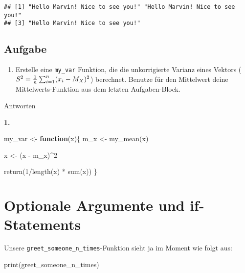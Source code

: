 \documentclass[
]{book}
\newenvironment{Shaded}{\begin{snugshade}}{\end{snugshade}}
\newcommand{\ControlFlowTok}[1]{\textcolor[rgb]{0.13,0.29,0.53}{\textbf{#1}}}
\newcommand{\DecValTok}[1]{\textcolor[rgb]{0.00,0.00,0.81}{#1}}
\newcommand{\FunctionTok}[1]{\textcolor[rgb]{0.00,0.00,0.00}{#1}}
\newcommand{\NormalTok}[1]{#1}
\newcommand{\OtherTok}[1]{\textcolor[rgb]{0.56,0.35,0.01}{#1}}
\newcommand{\SpecialCharTok}[1]{\textcolor[rgb]{0.00,0.00,0.00}{#1}}
\providecommand{\tightlist}{%
  \setlength{\itemsep}{0pt}\setlength{\parskip}{0pt}}
\begin{document}
\begin{verbatim}
## [1] "Hello Marvin! Nice to see you!" "Hello Marvin! Nice to see you!"
## [3] "Hello Marvin! Nice to see you!"
\end{verbatim}

\hypertarget{aufgabe-1}{%
\subsection{Aufgabe}\label{aufgabe-1}}

\begin{enumerate}
\def\labelenumi{\arabic{enumi}.}
\tightlist
\item
  Erstelle eine \texttt{my\_var} Funktion, die die unkorrigierte Varianz eines Vektors (\(S^2 = {1\over{n}} \sum_{i=1}^n(x_i -M_X)^2\)) berechnet. Benutze für den Mittelwert deine Mittelwerts-Funktion aus dem letzten Aufgaben-Block.
\end{enumerate}

Antworten

\textbf{1.}

\begin{Shaded}
\begin{Highlighting}[]
\NormalTok{my\_var }\OtherTok{\textless{}{-}} \ControlFlowTok{function}\NormalTok{(x)\{}
\NormalTok{  m\_x }\OtherTok{\textless{}{-}} \FunctionTok{my\_mean}\NormalTok{(x)}
  
\NormalTok{  x }\OtherTok{\textless{}{-}}\NormalTok{ (x }\SpecialCharTok{{-}}\NormalTok{ m\_x)}\SpecialCharTok{\^{}}\DecValTok{2}
  
  \FunctionTok{return}\NormalTok{(}\DecValTok{1}\SpecialCharTok{/}\FunctionTok{length}\NormalTok{(x) }\SpecialCharTok{*} \FunctionTok{sum}\NormalTok{(x))}
\NormalTok{\}}
\end{Highlighting}
\end{Shaded}

\hypertarget{optionale-argumente-und-if-statements}{%
\section{Optionale Argumente und if-Statements}\label{optionale-argumente-und-if-statements}}

Unsere \texttt{greet\_someone\_n\_times}-Funktion sieht ja im Moment wie folgt aus:

\begin{Shaded}
\begin{Highlighting}[]
\FunctionTok{print}\NormalTok{(greet\_someone\_n\_times)}
\end{Highlighting}
\end{Shaded}
\end{document}
